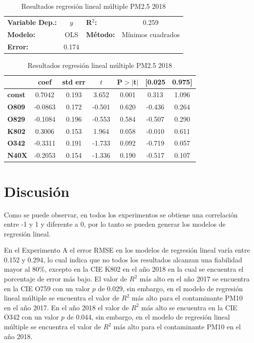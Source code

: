 \begin{table}[hbt!]
\caption{Resultados regresión lineal múltiple PM2.5 2018}
\label{tab:RRLM PM2.5 2018}
\begin{center}
\begin{tabular}{lclc}
\toprule
\textbf{Variable Dep.:}    &        $y$         & \textbf{  R$^2$:         } &     0.259   \\
\textbf{Modelo:}            &       OLS        & \textbf{Método:}           &  Mínimos cuadrados   \\
\textbf{Error:}            & 0.174  \\
\bottomrule
\end{tabular}
\begin{tabular}{lcccccc}
               & \textbf{coef} & \textbf{std err} & \textbf{$t$} & \textbf{P$> |$t$|$} & \textbf{[0.025} & \textbf{0.975]}  \\
\midrule
\textbf{const} &       0.7042  &        0.193     &     3.652  &         0.001        &        0.313    &        1.096     \\
\textbf{O809}  &      -0.0863  &        0.172     &    -0.501  &         0.620        &       -0.436    &        0.264     \\
\textbf{O829}  &      -0.1084  &        0.196     &    -0.553  &         0.584        &       -0.507    &        0.290     \\
\textbf{K802}  &       0.3006  &        0.153     &     1.964  &         0.058        &       -0.010    &        0.611     \\
\textbf{O342}  &      -0.3311  &        0.191     &    -1.733  &         0.092        &       -0.719    &        0.057     \\
\textbf{N40X}  &      -0.2053  &        0.154     &    -1.336  &         0.190        &       -0.517    &        0.107     \\
\bottomrule
\end{tabular}
\end{center}
\end{table}


\clearpage
\section{Discusión}
Como se puede observar, en todos los experimentos se obtiene una correlación entre -1 y 1 y diferente a 0, por lo tanto se pueden generar los modelos de regresión lineal.

En el Experimento A el error RMSE en los modelos de regresión lineal varía entre 0.152 y 0.294, lo cual indica que no todos los resultados alcanzan una fiabilidad mayor al 80\%, excepto en la CIE K802 en el año 2018 en la cual se encuentra el porcentaje de error más bajo. 
El valor de $R^2$ más alto en el año 2017 se encuentra en la CIE O759 con un valor $p$ de 0.029, sin embargo, en el modelo de regresión lineal múltiple se encuentra el valor de $R^2$ más alto para el contaminante PM10 en el año 2017. En el año 2018 el valor de $R^2$ más alto se encuentra en la CIE O342 con un valor $p$ de 0.044, sin embargo, en el modelo de regresión lineal múltiple se encuentra el valor de $R^2$ más alto para el contaminante PM10 en el año 2018.

